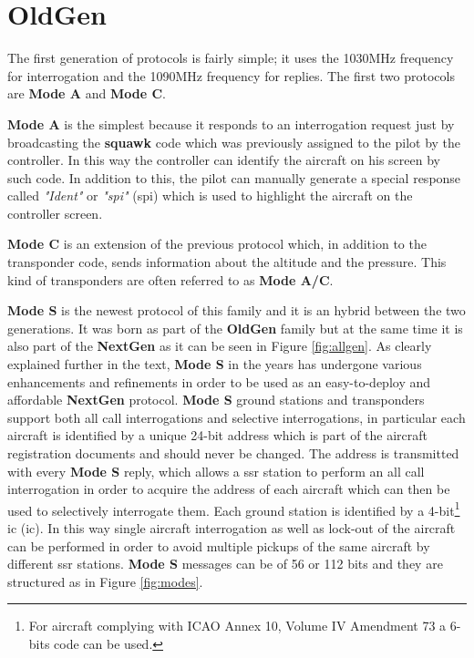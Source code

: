 \documentclass[../main.tex]{subfiles}
\begin{document}
\section{OldGen}

The first generation of protocols is fairly simple; it uses the 1030MHz frequency for interrogation and the 1090MHz frequency for replies.
The first two protocols are \textbf{Mode A} and \textbf{Mode C}.

\textbf{Mode A} is the simplest because it responds to an interrogation request just by broadcasting the \textbf{squawk} code which was previously assigned to the pilot by the controller. In this way the controller can identify the aircraft on his screen by such code. In addition to this, the pilot can manually generate a special response called \textit{"Ident"} or \textit{"\acrshort{spi}"} (\acrlong{spi}) which is used to highlight the aircraft on the controller screen.

\textbf{Mode C} is an extension of the previous protocol which, in addition to the transponder code, sends information about the altitude and the pressure. This kind of transponders are often referred to as \textbf{Mode A/C}.

\textbf{Mode S} is the newest protocol of this family and it is an hybrid between the two generations. It was born as part of the \textbf{OldGen} family but at the same time it is also part of the \textbf{NextGen} as it can be seen in Figure \ref{fig:allgen}. As clearly explained further in the text, \textbf{Mode S} in the years has undergone various enhancements and refinements in order to be used as an easy-to-deploy and affordable \textbf{NextGen} protocol. \textbf{Mode S} ground stations and transponders support both all call interrogations and selective interrogations, in particular each aircraft is identified by a unique 24-bit address which is part of the aircraft registration documents and should never be changed. The address is transmitted with every \textbf{Mode S} reply, which allows a \acrshort{ssr} station to perform an all call interrogation in order to acquire the address of each aircraft which can then be used to selectively interrogate them. Each ground station is identified by a 4-bit\footnote{For aircraft complying with ICAO Annex 10, Volume IV Amendment 73 a 6-bits code can be used.} \acrlong{ic} (\acrshort{ic}). In this way single aircraft interrogation as well as lock-out of the aircraft can be performed in order to avoid multiple pickups of the same aircraft by different \acrshort{ssr} stations. \textbf{Mode S} messages can be of 56 or 112 bits and they are structured as in Figure \ref{fig:modes}.
\end{document}
